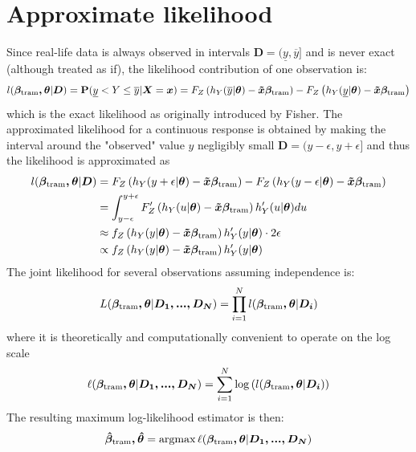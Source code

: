 \documentclass[11pt,a4paper,twoside]{book}\usepackage[]{graphicx}\usepackage[]{xcolor}
\begin{document}
\section{Approximate likelihood}\label{sec:approxlikelihood}
Since real-life data is always observed in intervals $\boldsymbol{D}=(\underline{y},\overline{y}]$ and is never exact (although treated as if), the likelihood contribution of one observation is:
\begin{align*}
l(\boldsymbol{\beta_{\text{tram}},\theta}|\boldsymbol{D})={\mathbf{P}}(\underline{y}< Y\leq \overline{y}|\boldsymbol{X}=\boldsymbol{x})=F_Z\left(h_Y(\overline{y}|\boldsymbol{\theta})-\boldsymbol{\tilde{x}}\boldsymbol{\beta_{\text{tram}}}\right)-F_Z\left(h_Y(\underline{y}|\boldsymbol{\theta})-\boldsymbol{\tilde{x}}\boldsymbol{\beta_{\text{tram}}}\right)
\end{align*}
which is the exact likelihood as originally introduced by Fisher. The approximated likelihood for a continuous response is obtained by making the interval around the "observed" value $y$ negligibly small $\boldsymbol{D}=(y-\epsilon,y+\epsilon]$ and thus the likelihood is approximated as
\begin{align*}
l(\boldsymbol{\beta_{\text{tram}},\theta}|\boldsymbol{D})&=F_Z\left(h_Y(y+\epsilon|\boldsymbol{\theta})-\boldsymbol{\tilde{x}}\boldsymbol{\beta_{\text{tram}}}\right)-F_Z\left(h_Y(y-\epsilon|\boldsymbol{\theta})-\boldsymbol{\tilde{x}}\boldsymbol{\beta_{\text{tram}}}\right)\\
&=\int_{y-\epsilon}^{y+\epsilon}F_Z'\left(h_Y(u|\boldsymbol{\theta})-\boldsymbol{\tilde{x}}\boldsymbol{\beta_{\text{tram}}}\right)h_Y'(u|\boldsymbol{\theta})du\\
&\approx f_Z\left(h_Y(y|\boldsymbol{\theta})-\boldsymbol{\tilde{x}}\boldsymbol{\beta_{\text{tram}}}\right)h_Y'(y|\boldsymbol{\theta})\cdot 2\epsilon\\
&\propto f_Z\left(h_Y(y|\boldsymbol{\theta})-\boldsymbol{\tilde{x}}\boldsymbol{\beta_{\text{tram}}}\right)h_Y'(y|\boldsymbol{\theta})
\end{align*}
The joint likelihood for several observations assuming independence is:
\begin{align*}
L(\boldsymbol{\beta_{\text{tram}},\theta}|\boldsymbol{D_1,...,D_N})=\prod_{i=1}^N l(\boldsymbol{\beta_{\text{tram}},\theta}|\boldsymbol{D_i})
\end{align*}
where it is theoretically and computationally convenient to operate on the log scale
\begin{align*}
\ell(\boldsymbol{\beta_{\text{tram}},\theta}|\boldsymbol{D_1,...,D_N})=\sum_{i=1}^N \log\left(l(\boldsymbol{\beta_{\text{tram}},\theta}|\boldsymbol{D_i})\right)
\end{align*}
The resulting maximum log-likelihood estimator is then:
\begin{align*}
\boldsymbol{\hat{\beta}_{\text{tram}},\hat\theta}=\operatorname*{argmax} \ell(\boldsymbol{\beta_{\text{tram}},\theta}|\boldsymbol{D_1,...,D_N})
\end{align*}
\end{document}
